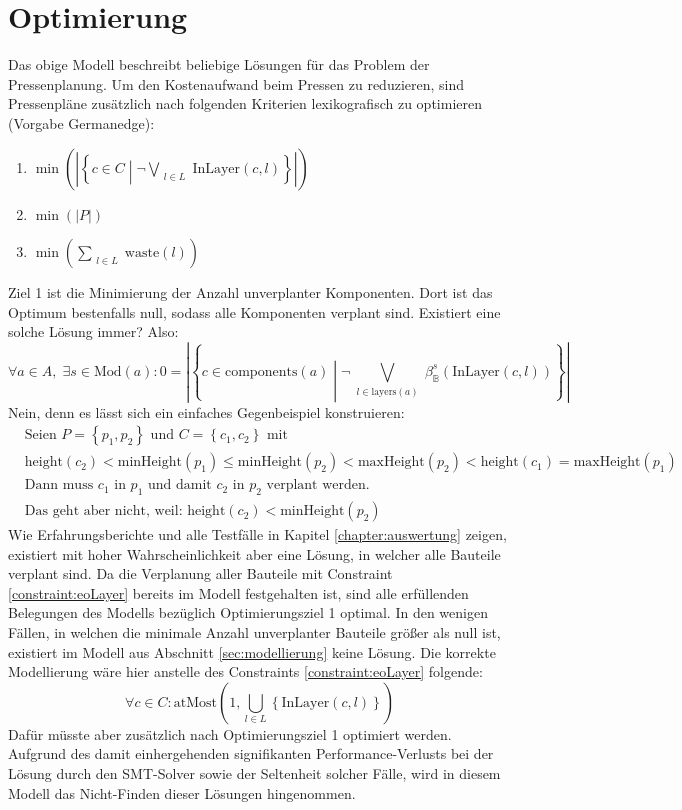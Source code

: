\section{Optimierung}
\label{sec:optimierung}
Das obige Modell beschreibt beliebige Lösungen für das Problem der Pressenplanung.
Um den Kostenaufwand beim Pressen zu reduzieren, sind Pressenpläne zusätzlich nach folgenden Kriterien lexikografisch zu optimieren (Vorgabe Germanedge):
\begin{enumerate}
    \item $ \min \left( \left\lvert \left\{ c \in C \middle| \neg\bigvee\limits_{\substack{l \in L}} \text{InLayer}(c,l) \right\} \right\rvert \right) $
    \item $ \min (\lvert P \rvert) $
    \item $ \min \left(\sum\limits_{\substack{l \in L}} \text{waste}(l) \right) $
\end{enumerate}
Ziel 1 ist die Minimierung der Anzahl unverplanter Komponenten.
Dort ist das Optimum bestenfalls null, sodass alle Komponenten verplant sind.
Existiert eine solche Lösung immer?
Also:
\[
    \forall a \in A, \; \exists s \in \text{Mod}(a): 0 = \left\lvert \left\{ c \in \text{components}(a) \middle| \neg\bigvee\limits_{\substack{l \in \text{layers}(a)}} \beta_{\mathbb{B}}^{s}(\text{InLayer}(c,l)) \right\} \right\rvert
\]
Nein, denn es lässt sich ein einfaches Gegenbeispiel konstruieren:
\begin{align*}
    &\hspace{0pt} \text{Seien } P = \left\{ p_1, p_2 \right\} \text{ und } C = \left\{ c_1,c_2 \right\} \text{ mit } \\
    &\hspace{0pt} \text{height}(c_2) < \text{minHeight}(p_1) \leq \text{minHeight}(p_2) < \text{maxHeight}(p_2) < \text{height}(c_1) = \text{maxHeight}(p_1) \\
    &\hspace{0pt} \text{Dann muss } c_1 \text{ in } p_1 \text{ und damit } c_2 \text{ in } p_2 \text{ verplant werden.} \\
    &\hspace{0pt} \text{Das geht aber nicht, weil: } \text{height}(c_2) < \text{minHeight}(p_2)
\end{align*}
Wie Erfahrungsberichte und alle Testfälle in Kapitel \ref{chapter:auswertung} zeigen, existiert mit hoher Wahrscheinlichkeit aber eine Lösung, in welcher alle Bauteile verplant sind.
Da die Verplanung aller Bauteile mit Constraint \ref{constraint:eoLayer} bereits im Modell festgehalten ist, sind alle erfüllenden Belegungen des Modells
bezüglich Optimierungsziel 1 optimal.
In den wenigen Fällen, in welchen die minimale Anzahl unverplanter Bauteile größer als null ist, existiert im Modell aus Abschnitt \ref{sec:modellierung} keine Lösung.
Die korrekte Modellierung wäre hier anstelle des Constraints \ref{constraint:eoLayer} folgende:
\[
    \forall c \in C: \text{atMost}\left(1, \bigcup_{l \in L} \left\{ \text{InLayer}(c,l) \right\}\right)
\]
Dafür müsste aber zusätzlich nach Optimierungsziel 1 optimiert werden.
Aufgrund des damit einhergehenden signifikanten Performance-Verlusts bei der Lösung durch den SMT-Solver sowie der Seltenheit solcher Fälle,
wird in diesem Modell das Nicht-Finden dieser Lösungen hingenommen.
